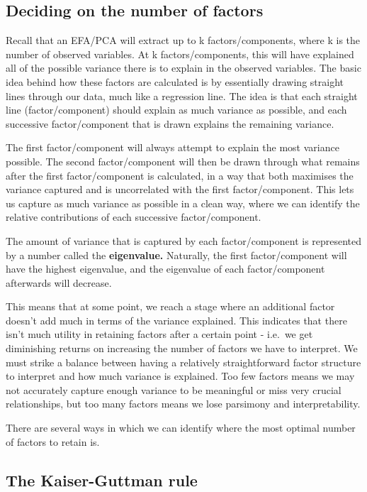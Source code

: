 \documentclass[
]{book}
\begin{document}
\hypertarget{deciding-on-the-number-of-factors}{%
\subsection{Deciding on the number of factors}\label{deciding-on-the-number-of-factors}}

Recall that an EFA/PCA will extract up to k factors/components, where k is the number of observed variables. At k factors/components, this will have explained all of the possible variance there is to explain in the observed variables. The basic idea behind how these factors are calculated is by essentially drawing straight lines through our data, much like a regression line. The idea is that each straight line (factor/component) should explain as much variance as possible, and each successive factor/component that is drawn explains the remaining variance.

The first factor/component will always attempt to explain the most variance possible. The second factor/component will then be drawn through what remains after the first factor/component is calculated, in a way that both maximises the variance captured and is uncorrelated with the first factor/component. This lets us capture as much variance as possible in a clean way, where we can identify the relative contributions of each successive factor/component.

The amount of variance that is captured by each factor/component is represented by a number called the \textbf{eigenvalue.} Naturally, the first factor/component will have the highest eigenvalue, and the eigenvalue of each factor/component afterwards will decrease.

This means that at some point, we reach a stage where an additional factor doesn't add much in terms of the variance explained. This indicates that there isn't much utility in retaining factors after a certain point - i.e.~we get diminishing returns on increasing the number of factors we have to interpret. We must strike a balance between having a relatively straightforward factor structure to interpret and how much variance is explained. Too few factors means we may not accurately capture enough variance to be meaningful or miss very crucial relationships, but too many factors means we lose parsimony and interpretability.

There are several ways in which we can identify where the most optimal number of factors to retain is.

\hypertarget{the-kaiser-guttman-rule}{%
\subsection{The Kaiser-Guttman rule}\label{the-kaiser-guttman-rule}}
\end{document}
